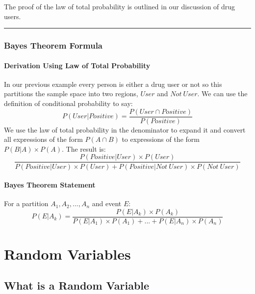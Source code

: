 \documentclass[
]{book}
\theoremstyle{definition}
\theoremstyle{definition}
\theoremstyle{definition}
\theoremstyle{remark}
\begin{document}
The proof of the law of total probability is outlined in our discussion of drug users.

\begin{center}\rule{0.5\linewidth}{0.5pt}\end{center}

\hypertarget{bayes-theorem-formula}{%
\subsection{Bayes Theorem Formula}\label{bayes-theorem-formula}}

\hypertarget{derivation-using-law-of-total-probability}{%
\subsubsection{Derivation Using Law of Total Probability}\label{derivation-using-law-of-total-probability}}

In our previous example every person is either a drug user or not so this partitions the sample space into two regions, \(User\) and \(Not \ User\). We can use the definition of conditional probability to say:
\[P(User|Positive)=\frac{P(User \cap Positive)}{P(Positive)}\]
We use the law of total probability in the denominator to expand it and convert all expressions of the form \(P(A \cap B)\) to expressions of the form \(P(B | A) \times P(A)\). The result is:
\[\frac{P(Positive|User) \times P(User)}{P(Positive|User) \times P(User)+P(Positive|Not \ User) \times P(Not \ User)}\]

\hypertarget{bayes-theorem-statement}{%
\subsubsection{Bayes Theorem Statement}\label{bayes-theorem-statement}}

For a partition \(A_1,A_2,...,A_n\) and event \(E\):
\[P(E|A_k) = \frac{P(E|A_k) \times P(A_k)}{P(E|A_1) \times P(A_1) +...+ P(E|A_n) \times P(A_n)}\]

\hypertarget{random-variables}{%
\chapter{Random Variables}\label{random-variables}}

\hypertarget{what-is-a-random-variable}{%
\section{What is a Random Variable}\label{what-is-a-random-variable}}
\end{document}

